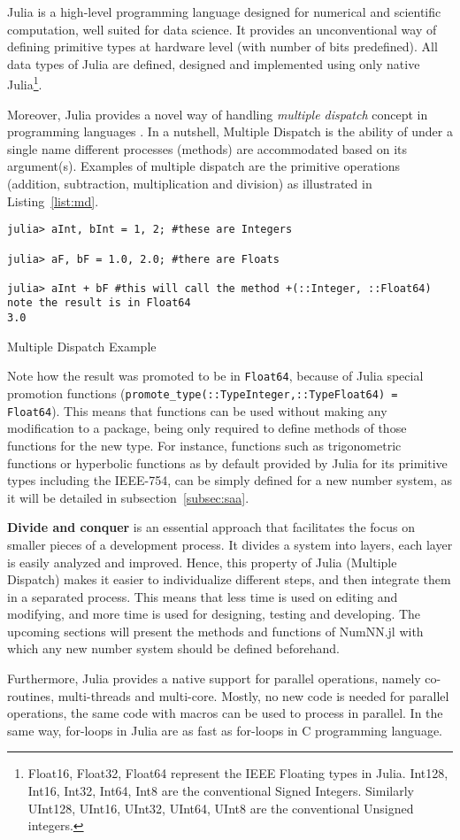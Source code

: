 Julia \cite{Julia,Bezanson2017} is a high-level programming language designed for numerical and scientific computation, well suited for data science. It provides an unconventional way of defining primitive types at hardware level (with number of bits predefined). All data types of Julia are defined, designed and implemented using only native Julia\footnote{{Float16, Float32, Float64} represent the IEEE Floating types in Julia. {Int128, Int16, Int32, Int64, Int8} are the conventional Signed Integers. Similarly {UInt128, UInt16, UInt32, UInt64, UInt8} are the conventional Unsigned integers.}.

Moreover, Julia provides a novel way of handling \emph{multiple dispatch} \cite{WikiMultipleDispatch} concept in programming languages \cite{JuliaMehtods}. In a nutshell, Multiple Dispatch is the ability of under a single name different processes (methods) are accommodated based on its argument(s). Examples of multiple dispatch are the primitive operations (addition, subtraction, multiplication and division) as illustrated in Listing~\ref{list:md}.

\begin{listing}[H]
\begin{verbatim}
julia> aInt, bInt = 1, 2; #these are Integers

julia> aF, bF = 1.0, 2.0; #there are Floats

julia> aInt + bF #this will call the method +(::Integer, ::Float64) note the result is in Float64
3.0
\end{verbatim}
\caption{Multiple Dispatch Example}\label{list:md}
\end{listing}

Note how the result was promoted to be in \texttt{Float64}, because of Julia special promotion functions (\texttt{promote_type(::Type{Integer},::Type{Float64}) = Float64}). This means that functions can be used without making any modification to a package, being only required to define methods of those functions for the new type. For instance, functions such as trigonometric functions or hyperbolic functions as by default provided by Julia for its primitive types including the IEEE-754, can be simply defined for a new number system, as it will be detailed in subsection~\ref{subsec:saa}.

\textbf{Divide and conquer} is an essential approach that facilitates the focus on smaller pieces of a development process. It divides a system into layers, each layer is easily analyzed and improved. Hence, this property of Julia (Multiple Dispatch) makes it easier to individualize different steps, and then integrate them in a separated process. This means that less time is used on editing and modifying, and more time is used for designing, testing and developing. The upcoming sections will present the methods and functions of NumNN.jl with which any new number system should be defined beforehand.

Furthermore, Julia provides a native support for parallel operations, namely co-routines, multi-threads and multi-core. Mostly, no new code is needed for parallel operations, the same code with macros can be used to process in parallel. In the same way, for-loops in Julia are as fast as for-loops in C programming language. 
